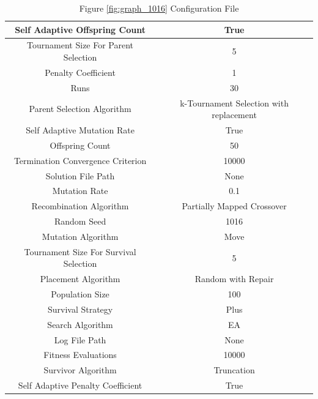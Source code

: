 \documentclass{standalone}
\begin{document}
\begin{table}[!htb]
	\centering
	\caption{Figure \ref{fig:graph_1016} Configuration File}
	\label{tab:graph_1016}
	\begin{tabular}{| c | c |}
		\hline
		Self Adaptive Offspring Count		& True		 \\
		\hline
		Tournament Size For Parent Selection		& 5		 \\
		\hline
		Penalty Coefficient		& 1		 \\
		\hline
		Runs		& 30		 \\
		\hline
		Parent Selection Algorithm		& k-Tournament Selection with replacement		 \\
		\hline
		Self Adaptive Mutation Rate		& True		 \\
		\hline
		Offspring Count		& 50		 \\
		\hline
		Termination Convergence Criterion		& 10000		 \\
		\hline
		Solution File Path		& None		 \\
		\hline
		Mutation Rate		& 0.1		 \\
		\hline
		Recombination Algorithm		& Partially Mapped Crossover		 \\
		\hline
		Random Seed		& 1016		 \\
		\hline
		Mutation Algorithm		& Move		 \\
		\hline
		Tournament Size For Survival Selection		& 5		 \\
		\hline
		Placement Algorithm		& Random with Repair		 \\
		\hline
		Population Size		& 100		 \\
		\hline
		Survival Strategy		& Plus		 \\
		\hline
		Search Algorithm		& EA		 \\
		\hline
		Log File Path		& None		 \\
		\hline
		Fitness Evaluations		& 10000		 \\
		\hline
		Survivor Algorithm		& Truncation		 \\
		\hline
		Self Adaptive Penalty Coefficient		& True		 \\
		\hline
	\end{tabular}
\end{table}
\end{document}
